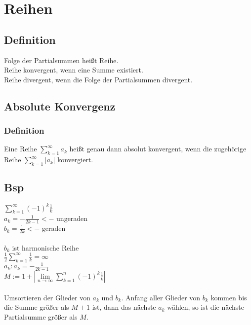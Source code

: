 \documentclass[.../mainfile.tex]{subfiles}
\begin{document}
	
	\section{Reihen}	
	
	\subsection{Definition}
	Folge der Partialsummen heißt Reihe.\\
	Reihe konvergent, wenn eine Summe existiert.\\
	Reihe divergent, wenn die Folge der Partialsummen divergent.\\
	
	\subsection{Absolute Konvergenz}
	\subsubsection{Definition}
	Eine Reihe $\sum^\infty_{k=1}a_{k}$ heißt genau dann absolut konvergent, wenn die zugehörige Reihe $\sum^\infty_{k=1}|a_{k}|$ konvergiert.
	\subsection*{Bsp}
	$\sum^\infty_{k=1}(-1)^{k}\frac{1}{k}$\\
	$a_{k}=-\frac{1}{2k-1}  <-$  ungeraden\\
	$b_{k}=\frac{1}{2k}  <-$  geraden\\\\
	$b_{k}$ ist harmonische Reihe\\
	$\frac{1}{2}\sum^\infty_{k=1}\frac{1}{k}=\infty$\\
	$a_{k}: a_{k} =-\frac{1}{2k-1}$\\
	$M:=1+|\lim\limits_{n \rightarrow \infty}{\sum^n_{k=1}}(-1)^{k}\frac{1}{k}|$\\\\
	Umsortieren der Glieder von $ a_{k} $ und $ b_{k} $. Anfang aller Glieder von $ b_{k} $ kommen bis die Summe größer als $M+1$ ist, dann das nächste $ a_{k} $ wählen, so ist die nächste Partialsumme größer als $M$.
\end{document}
